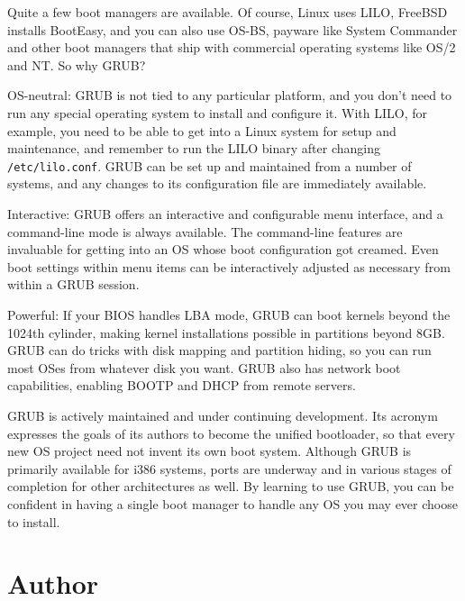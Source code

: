 \documentclass{article}
\begin{document}
Quite a few boot managers are available. Of course, Linux uses LILO, FreeBSD installs BootEasy, and you can also use OS-BS, payware like System Commander and other boot managers that ship with commercial operating systems like OS/2 and NT. So why GRUB?

OS-neutral: GRUB is not tied to any particular platform, and you don't need to run any special operating system to install and configure it. With LILO, for example, you need to be able to get into a Linux system for setup and maintenance, and remember to run the LILO binary after changing \texttt{/etc/lilo.conf}. GRUB can be set up and maintained from a number of systems, and any changes to its configuration file are immediately available.

Interactive: GRUB offers an interactive and configurable menu interface, and a command-line mode is always available. The command-line features are invaluable for getting into an OS whose boot configuration got creamed. Even boot settings within menu items can be interactively adjusted as necessary from within a GRUB session.

Powerful: If your BIOS handles LBA mode, GRUB can boot kernels beyond the 1024th cylinder, making kernel installations possible in partitions beyond 8GB. GRUB can do tricks with disk mapping and partition hiding, so you can run most OSes from whatever disk you want. GRUB also has network boot capabilities, enabling BOOTP and DHCP from remote servers.

GRUB is actively maintained and under continuing development. Its acronym expresses the goals of its authors to become the unified bootloader, so that every new OS project need not invent its own boot system. Although GRUB is primarily available for i386 systems, ports are underway and in various stages of completion for other architectures as well. By learning to use GRUB, you can be confident in having a single boot manager to handle any OS you may ever choose to install.









\section{Author}
\end{document}
